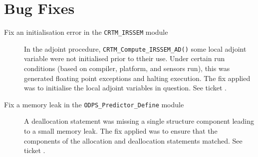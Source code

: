 \section*{Bug Fixes}

\begin{description}

\item[Fix an initialisation error in the \texttt{CRTM\_IRSSEM} module] In the adjoint procedure, \texttt{CRTM\_Compute\_IRSSEM\_AD()} some local adjoint variable were not initialised prior to ttheir use. Under certain run conditions (based on compiler, platform, and sensors run), this was generated floating point exceptions and halting execution. The fix applied was to initialise the local adjoint variables in question. See ticket .

\item[Fix a memory leak in the \texttt{ODPS\_Predictor\_Define} module] A deallocation statement was missing a single structure component leading to a small memory leak. The fix applied was to ensure that the components of the allocation and deallocation statements matched. See ticket .

\end{description}


